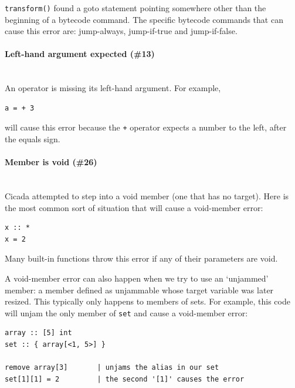 \documentclass{article}
\newenvironment{code}{
       \begin{list}{}{
               \setlength{\leftmargin}{.4in}
               \setlength{\rightmargin}{0in}
               \setlength{\topsep}{.2in}
       }
       \small
       \item[] }
       { \end{list}   }
\begin{document}
\verb#transform()# found a goto statement pointing somewhere other than the beginning of a bytecode command.  The specific bytecode commands that can cause this error are:  jump-always, jump-if-true and jump-if-false.\\




\paragraph{Left-hand argument expected (\#13)\\\\}

An operator is missing its left-hand argument.  For example,

\begin{code} \begin{verbatim}
a = + 3
\end{verbatim} \end{code}

\noindent will cause this error because the \verb#+# operator expects a number to the left, after the equals sign.\\




\paragraph{Member is void (\#26)\\\\}

Cicada attempted to step into a void member (one that has no target).  Here is the most common sort of situation that will cause a void-member error:

\begin{code} \begin{verbatim}
x :: *
x = 2
\end{verbatim} \end{code}

\noindent Many built-in functions throw this error if any of their parameters are void.

A void-member error can also happen when we try to use an `unjammed' member:  a member defined as unjammable whose target variable was later resized.  This typically only happens to members of sets.  For example, this code will unjam the only member of \verb#set# and cause a void-member error:

\begin{code} \begin{verbatim}
array :: [5] int
set :: { array[<1, 5>] }

remove array[3]       | unjams the alias in our set
set[1][1] = 2         | the second '[1]' causes the error  
\end{verbatim} \end{code}
\end{document}
